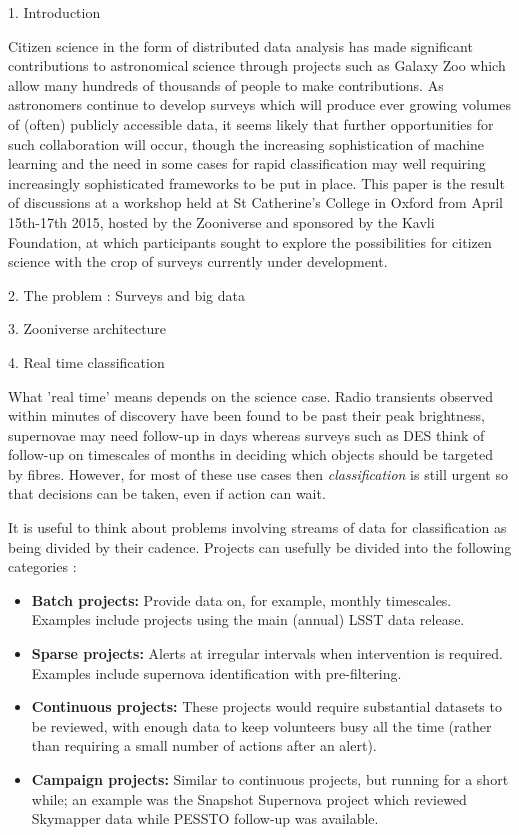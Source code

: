 1. Introduction

Citizen science in the form of distributed data analysis has made significant contributions to astronomical science through projects such as Galaxy Zoo which allow many hundreds of thousands of people to make contributions. As astronomers continue to develop surveys which will produce ever growing volumes of (often) publicly accessible data, it seems likely that further opportunities for such collaboration will occur, though the increasing sophistication of machine learning and the need in some cases for rapid classification may well requiring increasingly sophisticated frameworks to be put in place. This paper is the result of discussions at a workshop held at St Catherine's College in Oxford from April 15th-17th 2015, hosted by the Zooniverse and sponsored by the Kavli Foundation, at which participants sought to explore the possibilities for citizen science with the crop of surveys currently under development. 

2. The problem : Surveys and big data

3. Zooniverse architecture

4. Real time classification

What 'real time' means depends on the science case. Radio transients observed within minutes of discovery have been found to be past their peak brightness, supernovae may need follow-up in days whereas surveys such as DES think of follow-up on timescales of months in deciding which objects should be targeted by fibres. However, for most of these use cases then \emph{classification} is still urgent so that decisions can be taken, even if action can wait. 

It is useful to think about problems involving streams of data for classification as being divided by their cadence. Projects can usefully be divided into the following categories :

\begin{itemize}

\item \textbf{Batch projects:} Provide data on, for example, monthly timescales. Examples include projects using the main (annual) LSST data release.

\item \textbf{Sparse projects:} Alerts at irregular intervals when intervention is required. Examples include supernova identification with pre-filtering. 

\item \textbf{Continuous projects:} These projects would require substantial datasets to be reviewed, with enough data to keep volunteers busy all the time (rather than requiring a small number of actions after an alert). 

\item \textbf{Campaign projects:} Similar to continuous projects, but running for a short while; an example was the Snapshot Supernova project which reviewed Skymapper data while PESSTO follow-up was available. 

\end{itemize}

